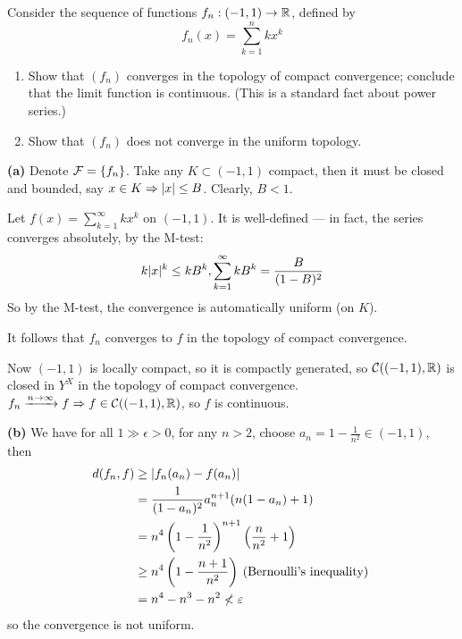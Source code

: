 \documentclass[a4paper, 10pt]{article}
\begin{document}
\begin{problem} [46.5 \done]
    Consider the sequence of functions $f_n: (-1, 1) \to \mathbb{R}$, defined by \begin{equation*}
    f_n(x) = \sum_{k=1}^{n} k x^k
    \end{equation*}
    \begin{enumerate}
    \item Show that $(f_n)$ converges in the topology of compact convergence; conclude that the limit function is continuous. (This is a standard fact about power series.)
    \item Show that $(f_n)$ does not converge in the uniform topology.
    \end{enumerate}
\end{problem}
\begin{solution}
\textbf{(a)} Denote $\mathcal{F} = \{f_n\}$. Take any $K \subset (-1, 1)$ compact, then it must be closed and bounded, say $x \in K \Rightarrow \lvert x\rvert \leq B$. Clearly, $B < 1$.

Let $f(x) = \sum_{k=1}^{\infty} kx^k$ on $(-1, 1)$. It is well-defined --- in fact, the series converges absolutely, by the M-test:
\begin{equation*}
k \lvert x\rvert^k \leq k B^k, \sum_{k=1}^{\infty} kB^k = \frac{B}{(1-B)^2}
\end{equation*}
So by the M-test, the convergence is automatically uniform (on $K$).

It follows that $f_n$ converges to $f$ in the topology of compact convergence.

Now $(-1, 1)$ is locally compact, so it is compactly generated, so $\mathcal{C}((-1, 1), \mathbb{R})$ is closed in $Y^X$ in the topology of compact convergence. $f_n \xrightarrow{n \to \infty} f \Rightarrow f \in \mathcal{C}((-1, 1), \mathbb{R})$, so $f$ is continuous.

\textbf{(b)} We have for all $1 \gg \epsilon > 0$, for any $n > 2$, choose $a_n = 1 - \frac{1}{n^2} \in (-1, 1)$, then
\begin{align*}
d(f_n, f) &\geq \lvert f_n(a_n) - f(a_n)\rvert \\
&= \frac{1}{(1-a_n)^2}a_n^{n+1} (n (1-a_n) + 1) \\
&= n^4 \left(1 - \frac{1}{n^2}\right)^{n+1} \left(\frac{n}{n^2} + 1\right) \\
&\geq n^4 \left(1 - \frac{n+1}{n^2}\right) \:\text{(Bernoulli's inequality)}\: \\
&= n^4 - n^3 - n^2 \not < \varepsilon
\end{align*}
so the convergence is not uniform.
\end{solution}
\end{document}
